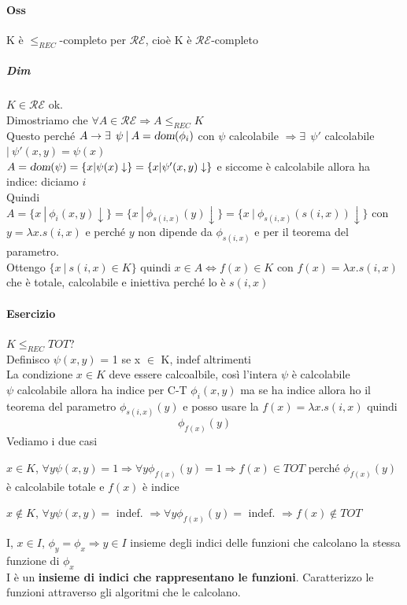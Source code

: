 \documentclass[10pt]{book}
\begin{document}
\paragraph{Oss} K è $\leq_{REC}$-completo per $\mathscr{RE}$, cioè K è $\mathscr{RE}$-completo
\subparagraph{Dim} $K \in \mathscr{RE}$ ok.\\
Dimostriamo che $\forall A \in \mathscr{RE} \Rightarrow A \leq_{REC} K$\\
Questo perché $A \rightarrow \exists\:\:\psi\: |\: A = \textsl{dom}(\phi_i)$ con $\psi$ calcolabile $\Rightarrow \exists\:\:\psi'$ calcolabile $|\: \psi'(x, y) = \psi(x)$\\
$A = \textsl{dom}(\psi) = \{x | \psi(x)\downarrow\} = \{x | \psi'(x, y)\downarrow\}$ e siccome è calcolabile allora ha indice: diciamo $i$\\
Quindi $A = \{x \: |\: \phi_i(x, y)\downarrow\} = \{x\: |\: \phi_{s(i, x)}(y)\downarrow\} = \{x\: |\: \phi_{s(i, x)}(s(i, x))\downarrow\}$ con $y = \lambda x.s(i, x)$ e perché $y$ non dipende da $\phi_{s(i, x)}$ e per il teorema del parametro.\\
Ottengo $\{x\:|\:s(i,x)\in K\}$ quindi $x\in A \Leftrightarrow f(x)\in K$ con $f(x) = \lambda x.s(i,x)$ che è totale, calcolabile e iniettiva perché lo è $s(i,x)$
\paragraph{Esercizio} $K \leq_{REC} TOT$?\\
Definisco $\psi(x, y)$ = 1 se x $\in$ K, indef altrimenti\\
La condizione $x \in K$ deve essere calcoalbile, così l'intera $\psi$ è calcolabile\\
$\psi$ calcolabile allora ha indice per C-T $\phi_i(x, y)$ ma se ha indice allora ho il teorema del parametro $\phi_{s(i, x)}(y)$ e posso usare la $f(x) = \lambda x.s(i, x)$ quindi
$$\phi_{f(x)}(y)$$
Vediamo i due casi
\begin{list}{}{}
	\item $x \in K$, $\forall y \psi(x, y) = 1 \Rightarrow \forall y \phi_{f(x)}(y) = 1 \Rightarrow f(x) \in TOT$ perché $\phi_{f(x)}(y)$ è calcolabile totale e $f(x)$ è indice
	\item $x \not\in K$, $\forall y \psi(x, y) =$ indef. $\Rightarrow \forall y \phi_{f(x)}(y) =$ indef. $\Rightarrow f(x) \not\in TOT$
\end{list}
I, $x \in I$, $\phi_y = \phi_x \Rightarrow y \in I$ insieme degli indici delle funzioni che calcolano la stessa funzione di $\phi_x$\\
I è un \textbf{insieme di indici che rappresentano le funzioni}. Caratterizzo le funzioni attraverso gli algoritmi che le calcolano.
\end{document}
